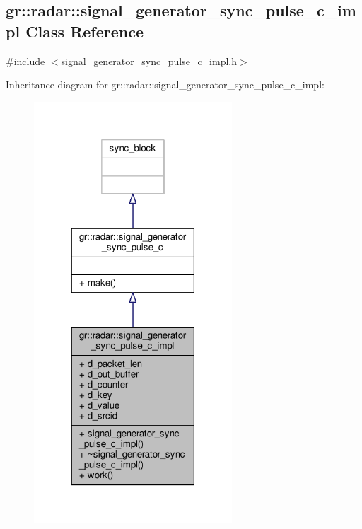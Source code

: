 \subsection{gr\+:\+:radar\+:\+:signal\+\_\+generator\+\_\+sync\+\_\+pulse\+\_\+c\+\_\+impl Class Reference}
\label{classgr_1_1radar_1_1signal__generator__sync__pulse__c__impl}


{\ttfamily \#include $<$signal\+\_\+generator\+\_\+sync\+\_\+pulse\+\_\+c\+\_\+impl.\+h$>$}



Inheritance diagram for gr\+:\+:radar\+:\+:signal\+\_\+generator\+\_\+sync\+\_\+pulse\+\_\+c\+\_\+impl\+:
\nopagebreak
\begin{figure}[H]
\begin{center}
\leavevmode
\includegraphics[width=210pt]{d8/d53/classgr_1_1radar_1_1signal__generator__sync__pulse__c__impl__inherit__graph}
\end{center}
\end{figure}


